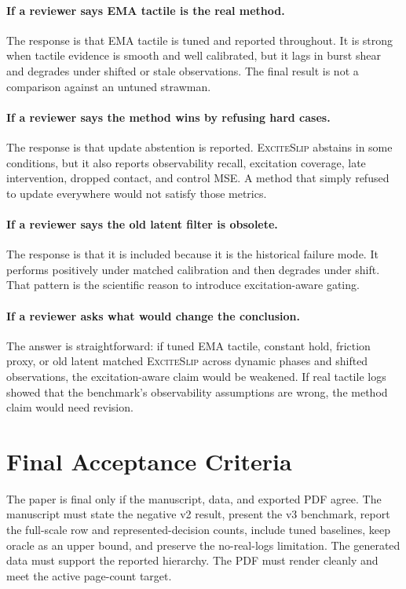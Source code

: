 \documentclass{article}
\newcommand{\method}{\textsc{ExciteSlip}\xspace}
\begin{document}
\paragraph{If a reviewer says EMA tactile is the real method.}
The response is that EMA tactile is tuned and reported throughout. It is strong when tactile evidence is smooth and well calibrated, but it lags in burst shear and degrades under shifted or stale observations. The final result is not a comparison against an untuned strawman.

\paragraph{If a reviewer says the method wins by refusing hard cases.}
The response is that update abstention is reported. \method abstains in some conditions, but it also reports observability recall, excitation coverage, late intervention, dropped contact, and control MSE. A method that simply refused to update everywhere would not satisfy those metrics.

\paragraph{If a reviewer says the old latent filter is obsolete.}
The response is that it is included because it is the historical failure mode. It performs positively under matched calibration and then degrades under shift. That pattern is the scientific reason to introduce excitation-aware gating.

\paragraph{If a reviewer asks what would change the conclusion.}
The answer is straightforward: if tuned EMA tactile, constant hold, friction proxy, or old latent matched \method across dynamic phases and shifted observations, the excitation-aware claim would be weakened. If real tactile logs showed that the benchmark's observability assumptions are wrong, the method claim would need revision.

\section{Final Acceptance Criteria}

The paper is final only if the manuscript, data, and exported PDF agree. The manuscript must state the negative v2 result, present the v3 benchmark, report the full-scale row and represented-decision counts, include tuned baselines, keep oracle as an upper bound, and preserve the no-real-logs limitation. The generated data must support the reported hierarchy. The PDF must render cleanly and meet the active page-count target.
\end{document}
